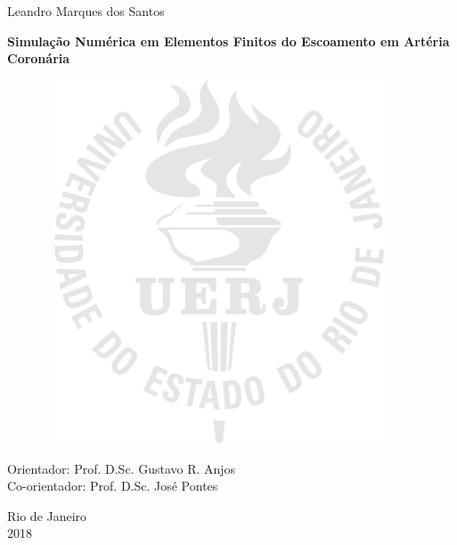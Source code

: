 \begin{center}

{\large Leandro Marques dos Santos}

\vspace{2cm}

\textbf{\LARGE Simulação Numérica em Elementos Finitos do Escoamento em
               Artéria Coronária}


\vspace{1.0cm}

\begin{figure}[hbt!]
\begin{center}
\includegraphics[width=10.48cm,height=10.8cm]{logos/logo_uerj_mark}
\end{center}
\end{figure}

\vspace{-9cm}
\begin{flushright}
\parbox{8cm}{
}
\end{flushright}

\vspace{4.0cm}

{\large Orientador: Prof. D.Sc. Gustavo R. Anjos\\
        Co-orientador: Prof. D.Sc. José Pontes}\\

\par\vfill

{\large Rio de Janeiro\\2018}

\end{center}
